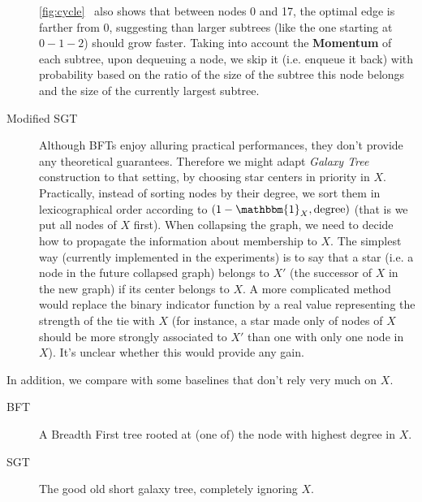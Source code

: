 \documentclass[a4paper,draft,notitlepage,11pt,svgnames]{scrartcl}
\begin{document}
\begin{description}
	\autoref{fig:cycle}~ also shows that between nodes 0
	and 17, the optimal edge is farther from 0, suggesting than larger subtrees
	(like the one starting at $0-1-2$) should grow faster. Taking into account
	the \textbf{Momentum} of each subtree, upon dequeuing a node, we skip it
	(i.e. enqueue it back) with probability based on the ratio of the size of
	the subtree this node belongs and the size of the currently largest
	subtree.

	\item[Modified SGT] Although BFTs enjoy alluring practical performances,
		they don't provide any theoretical guarantees. Therefore we might adapt
		\emph{Galaxy Tree} construction to that setting, by choosing star
		centers in priority in $X$. Practically, instead of sorting nodes by
		their degree, we sort them in lexicographical order according to $(1 -
		\mathbbm{1}_X, \textrm{degree})$ (that is we put all nodes of $X$
		first). When collapsing the graph, we need to decide how to propagate
		the information about membership to $X$. The simplest way (currently
		implemented in the experiments) is to say that a star (i.e. a node in
		the future collapsed graph) belongs to $X'$ (the successor of $X$ in
		the new graph) if its center belongs to $X$. A more complicated method
		would replace the binary indicator function by a real value
		representing the strength of the tie with $X$ (for instance, a star
		made only of nodes of $X$ should be more strongly associated to $X'$
		than one with only one node in $X$). It's unclear whether this would
		provide any gain.

\end{description}

In addition, we compare with some baselines that don't rely very much on $X$.

\begin{description}
	\item[BFT] A Breadth First tree rooted at (one of) the node with highest
		degree in $X$.
	\item[SGT] The good old short galaxy tree, completely ignoring $X$.
\end{description}
\end{document}
